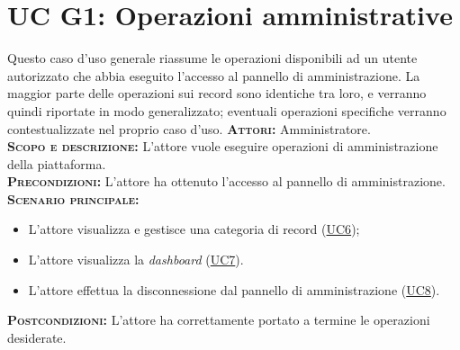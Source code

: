 \section{UC G1: Operazioni amministrative}
\label{sec:ucg1}
Questo caso d'uso generale riassume le operazioni disponibili ad un utente autorizzato che abbia eseguito l'accesso al pannello di amministrazione. La maggior parte delle operazioni sui record sono identiche tra loro, e verranno quindi riportate in modo generalizzato; eventuali operazioni specifiche verranno contestualizzate nel proprio caso d'uso.
\textsc{\textbf{Attori:}} Amministratore.\\
\textsc{\textbf{Scopo e descrizione:}} L'attore vuole eseguire operazioni di amministrazione della piattaforma.\\
\textsc{\textsc{\textbf{Precondizioni:}}} L'attore ha ottenuto l'accesso al pannello di amministrazione.\\
\textsc{\textbf{Scenario principale:}} 
\begin{itemize}
    \item L'attore visualizza e gestisce una categoria di record (\hyperref[sec:UC6]{UC6});
    \item L'attore visualizza la \textit{dashboard} (\hyperref[sec:uc7]{UC7}).
    \item L'attore effettua la disconnessione dal pannello di amministrazione (\hyperref[sec:UC8]{UC8}).
\end{itemize}
\textsc{\textbf{Postcondizioni:}} L'attore ha correttamente portato a termine le operazioni desiderate.

